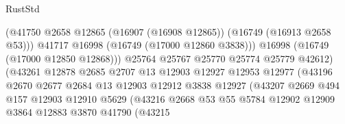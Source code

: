 \begin{lexlean}{RustStd}
\begin{coremodule}
                                          (@41750
                                            @2658
                                            @12865
                                            (@16907 (@16908 @12865))
                                            (@16749 (@16913 @2658 @53)))
                                          @41717
                                          @16998
                                          (@16749 (@17000 @12860 @3838)))
                                        @16998
                                        (@16749 (@17000 @12850 @12868)))
                                      @25764
                                      @25767
                                      @25770
                                      @25774
                                      @25779
                                      @42612)
                                    (@43261
                                      @12878
                                      @2685
                                      @2707
                                      @13
                                      @12903
                                      @12927
                                      @12953
                                      @12977
                                      (@43196
                                        @2670
                                        @2677
                                        @2684
                                        @13
                                        @12903
                                        @12912
                                        @3838
                                        @12927
                                        (@43207
                                          @2669
                                          @494
                                          @157
                                          @12903
                                          @12910
                                          @5629
                                          (@43216
                                            @2668
                                            @53
                                            @55
                                            @5784
                                            @12902
                                            @12909
                                            @3864
                                            @12883
                                            @3870
                                            @41790
                                            (@43215

\end{coremodule}
\end{lexlean}

